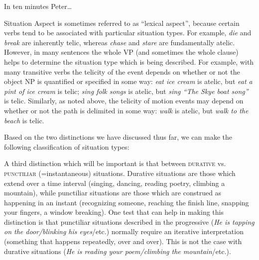 \ea \label{ex:20.7}
In ten minutes Peter…\\
                       \z
\z


Situation Aspect is sometimes referred to as “lexical aspect”, because certain verbs tend to be associated with particular situation types. For example, \textit{die} and \textit{break} are inherently telic, whereas \textit{chase} and \textit{stare} are fundamentally atelic. However, in many sentences the whole VP (and sometimes the whole clause) helps to determine the situation type which is being described. For example, with many transitive verbs the telicity of the event depends on whether or not the object NP is quantified or specified in some way: \textit{eat ice cream} is atelic, but \textit{eat a pint of ice cream} is telic; \textit{sing folk songs} is atelic, but \textit{sing “The Skye boat song”} is telic. Similarly, as noted above, the telicity of motion events may depend on whether or not the path is delimited in some way: \textit{walk} is atelic, but \textit{walk to the beach} is telic.



Based on the two distinctions we have discussed thus far, we can make the following classification of situation types:




A third distinction which will be important is that between \textsc{durative} vs. \textsc{punctiliar} (=instantaneous) situations. Durative situations are those which extend over a time interval (singing, dancing, reading poetry, climbing a mountain), while punctiliar situations are those which are construed as happening in an instant (recognizing someone, reaching the finish line, snapping your fingers, a window breaking). One test that can help in making this distinction is that punctiliar situations described in the progressive (\textit{He is tapping on the door/blinking his eyes}/etc.) normally require an iterative interpretation (something that happens repeatedly, over and over). This is not the case with durative situations (\textit{He is reading your poem/climbing the mountain}/etc.).



